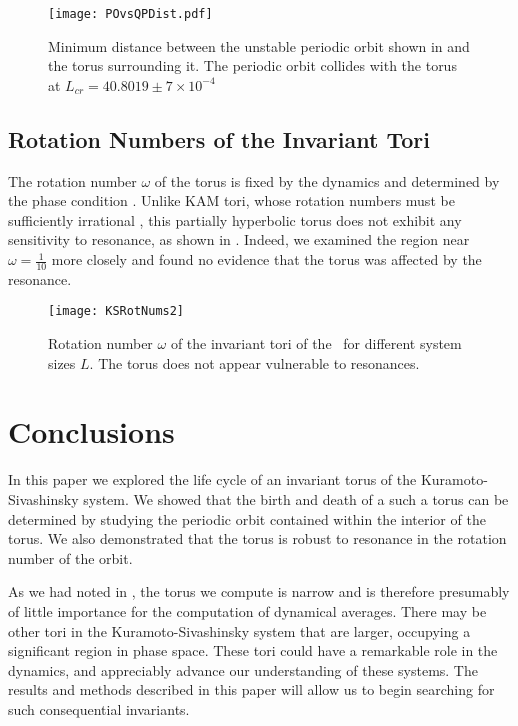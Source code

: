 \documentclass[aip,cha,reprint,
secnumarabic,
nofootinbib, tightenlines,
nobibnotes, showkeys, showpacs,
groupedaddress
]{revtex4-1}
\begin{document}
 \begin{figure}[!h]
\centering
\texttt{[image: POvsQPDist.pdf]}
  \caption{
  Minimum distance between the unstable periodic orbit shown in  and the torus surrounding it.  The periodic orbit collides with the torus at $L_{cr}=40.8019 \pm 7 \times 10^{-4}$
   }
  \label{fig:Collision}
 \end{figure}

 \subsection{Rotation Numbers of the Invariant Tori}
The rotation number $\omega$ of the torus is fixed by the dynamics and determined by the phase condition .  Unlike KAM tori, whose rotation numbers must be sufficiently irrational , this partially hyperbolic torus does not exhibit any sensitivity to resonance, as shown in .  Indeed, we examined the region near $\omega=\frac{1}{10}$ more closely and found no evidence that the torus was affected by the resonance.

 \begin{figure}[!h]
\centering
\texttt{[image: KSRotNums2]}
  \caption{
  Rotation number $\omega$ of the invariant tori of the \KSe\ for
  different system sizes $L$.  The torus does not appear vulnerable to
  resonances.
   }
  \label{fig:KSRotNums}
 \end{figure}

\section{Conclusions}
\label{s:concl}

In this paper we explored the life cycle of an invariant torus of the
Kuramoto-Sivashinsky system.  We showed that the birth and death of a
such a torus can be determined by studying the periodic orbit contained
within the interior of the torus.  We also demonstrated that the torus is
robust to resonance in the rotation number of the orbit.

As we had noted in , the torus we compute is narrow and
is therefore presumably of little importance for the computation of dynamical
averages.  There may be other tori in the Kuramoto-Sivashinsky system
that are larger, occupying a significant region in phase space.  These
tori could have a remarkable role in the dynamics, and appreciably
advance our understanding of these systems.  The results and methods
described in this paper will allow us to begin searching for such
consequential invariants.
\end{document}
